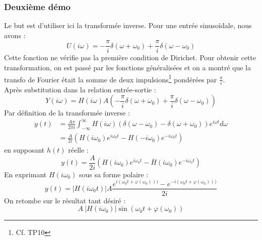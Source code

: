 		\subsubsection{Deuxième démo}
		Le but est d'utiliser ici la transformée inverse. Pour une entrée sinusoïdale, nous
		avons :
		\begin{equation}
		U(i\omega) = -\frac{\pi}{i}\delta(\omega+\omega_0) + \frac{\pi}{i}\delta(\omega-
		\omega_0)
		\label{eq:ExpErr}
		\end{equation}
		Cette fonction ne vérifie pas la première condition de Dirichet. Pour obtenir cette 
		transformation, on est passé par les fonctions généralisées et on a  montré que la transfo 
		de Fourier était la somme de deux impulsions\footnote{Cf. TP10} pondérées par 
		$\frac{\pi}{i}$.\\
		Après substitution dans la relation entrée-sortie :
		\begin{equation}
		Y(i\omega) = H(i\omega)A\left(-\frac{\pi}{i}\delta(\omega+\omega_0) + \frac{\pi}{i}
		\delta(\omega-\omega_0)\right)
		\end{equation}
		Par définition de la transformée inverse :
		\begin{equation}
		\begin{array}{ll}
		y(t) &= \frac{A\pi}{2\pi i}\int_{-\infty}^\infty H(i\omega)(\delta(\omega-\omega_0)-
		\delta(\omega+\omega_0))e^{i\omega t}d\omega\\
		 &= \frac{A}{2i}(H(i\omega_0)e^{i\omega_0t} - H(-i\omega_0)e^{-i\omega_0t})
		\end{array}
		\end{equation}
		en supposant $h(t)$ réelle :
		\begin{equation}
		y(t) = \frac{A}{2i}(H(i\omega_0)e^{i\omega_0t} - \overline{H}(i\omega_0)e^{-i\omega_0t})
		\end{equation}
		En exprimant $H(i\omega_0)$ sous sa forme polaire :
		\begin{equation}
		y(t) = |H(i\omega_0t)|A\frac{e^{i(\omega_0t+\varphi(\omega_0)))}-e^{-i(\omega_0t+\varphi
		(\omega_0)))}}{2i}
		\end{equation}
		On retombe sur le résultat tant désiré :	
		\begin{equation}
		A\ |H(i\omega_0)|\sin(\omega_0t+\varphi(\omega_0))
		\end{equation}
		

